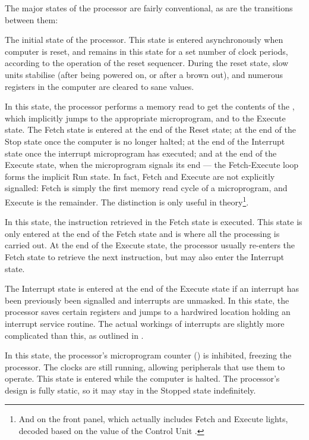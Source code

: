 The major states of the processor are fairly conventional, as are the transitions between them:

\begin{description}
 The initial state of the processor. This state is
  entered asynchronously when computer is reset, and remains in this state for
  a set number of clock periods, according to the operation of the reset
  sequencer. During the reset state, slow units stabilise (after being powered
  on, or after a brown out), and numerous registers in the computer are cleared
  to sane values.

 In this state, the processor performs a memory read to
  get the contents of the \IR, which implicitly jumps to the appropriate
  microprogram, and to the Execute state. The Fetch state is entered at the end
  of the Reset state; at the end of the Stop state once the computer is no
  longer halted; at the end of the Interrupt state once the interrupt
  microprogram has executed; and at the end of the Execute state, when the
  microprogram signals its end — the Fetch-Execute loop forms the implicit Run
  state. In fact, Fetch and Execute are not explicitly signalled: Fetch is
  simply the first memory read cycle of a microprogram, and Execute is the
  remainder. The distinction is only useful in theory\footnote{And on the front
    panel, which actually includes Fetch and Execute lights, decoded based on
    the value of the Control Unit .}.

 In this state, the instruction retrieved in the
  Fetch state is executed. This state is only entered at the end of the Fetch
  state and is where all the processing is carried out. At the end of the
  Execute state, the processor usually re-enters the Fetch state to retrieve
  the next instruction, but may also enter the Interrupt state.

 The Interrupt state is entered at the end of the Execute state
if an interrupt has been previously been signalled and interrupts are
unmasked. In this state, the processor saves certain registers and jumps to a
hardwired location holding an interrupt service routine. The actual workings of
interrupts are slightly more complicated than this, as outlined in
.

 In this state, the processor's microprogram counter
  (\UPC) is inhibited, freezing the processor. The clocks are still
  running, allowing peripherals that use them to operate. This state is entered
  while the computer is halted. The processor's design is fully static, so it
  may stay in the Stopped state indefinitely.

\end{description}

